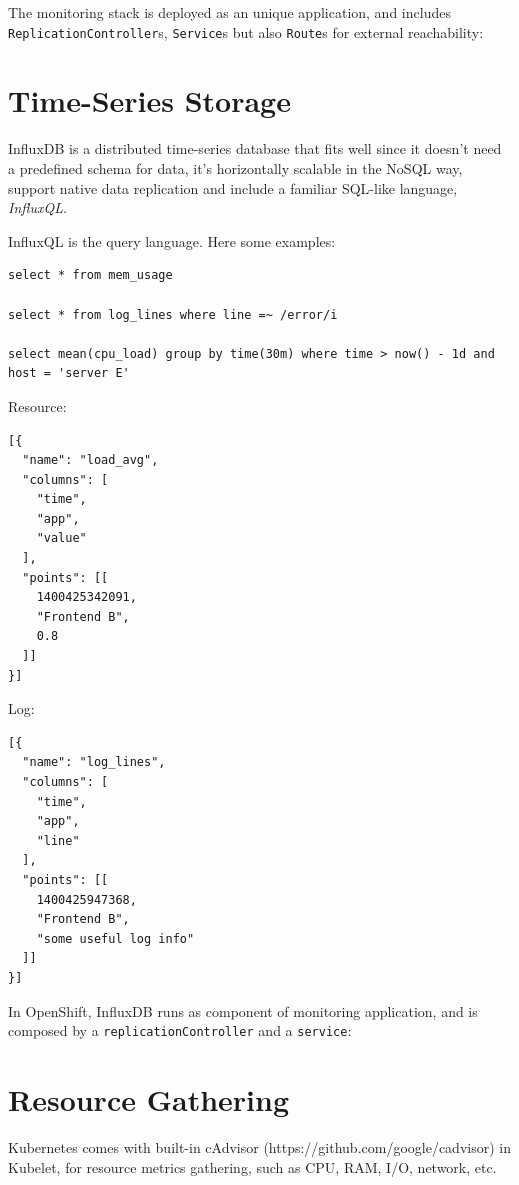 The monitoring stack is deployed as an unique application, and includes
\texttt{ReplicationController}s, \texttt{Service}s but also
\texttt{Route}s for external reachability:

\section{Time-Series Storage}\label{time-series-storage}

InfluxDB is a distributed time-series database that fits well since it
doesn't need a predefined schema for data, it's horizontally scalable
in the NoSQL way, support native data replication and include a familiar
SQL-like language, \emph{InfluxQL}.

InfluxQL is the query language. Here some examples:

\begin{verbatim}
select * from mem_usage

select * from log_lines where line =~ /error/i

select mean(cpu_load) group by time(30m) where time > now() - 1d and host = 'server E'
\end{verbatim}

Resource:

\begin{verbatim}
[{
  "name": "load_avg",
  "columns": [
    "time",
    "app",
    "value"
  ],
  "points": [[
    1400425342091,
    "Frontend B",
    0.8
  ]]
}]
\end{verbatim}

Log:

\begin{verbatim}
[{
  "name": "log_lines",
  "columns": [
    "time",
    "app",
    "line"
  ],
  "points": [[
    1400425947368,
    "Frontend B",
    "some useful log info"
  ]]
}]
\end{verbatim}

In OpenShift, InfluxDB runs as component of monitoring application, and
is composed by a \texttt{replicationController} and a \texttt{service}:

\section{Resource Gathering}\label{resource-gathering}

Kubernetes comes with built-in cAdvisor
(https://github.com/google/cadvisor) in Kubelet, for resource metrics
gathering, such as CPU, RAM, I/O, network, etc.

